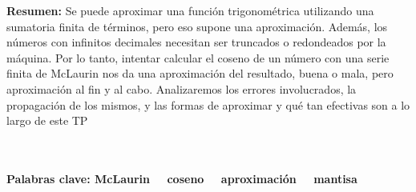 \maketitle

\textbf{Resumen:} Se puede aproximar una función trigonométrica utilizando una sumatoria finita de términos, pero eso supone una aproximación. Además, los números con infinitos decimales necesitan ser truncados o redondeados por la máquina. Por lo tanto, intentar calcular el coseno de un número con una serie finita de McLaurin nos da una aproximación del resultado, buena o mala, pero aproximación al fin y al cabo. Analizaremos los errores involucrados, la propagación de los mismos, y las formas de aproximar y qué tan efectivas son a lo largo de este TP

\\
\\

\textbf{Palabras clave: McLaurin \ \ coseno \ \ aproximación \ \ mantisa} 
